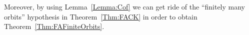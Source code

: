 \documentclass[a4paper]{article}
\theoremstyle{definition}
\DeclareMathOperator\ab{ab}
\newcommand*{\field}[1]{\mathbf{#1}}
\newcommand*{\Z}{\field{Z}}
\begin{document}
%
%
%
Moreover, by using Lemma~\ref{Lemma:Cof} we can get ride of the ``finitely many orbits'' hypothesis in Theorem~\ref{Thm:FACK} in order to obtain Theorem~\ref{Thm:FAFiniteOrbits}.
%
%
%
%
%
%
%
%
%
%
%
%
\end{document}
